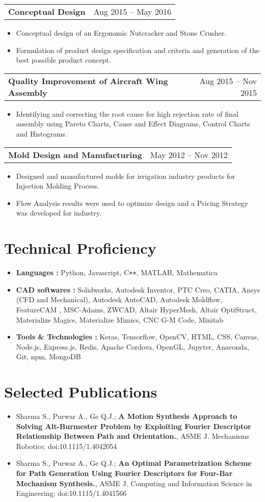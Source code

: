 \documentclass[letterpaper,10pt]{article}
\makeatletter
\newcommand{\resumeHeadingwithDate}[2]{
	\vspace{-1pt}
	\begin{tabular*}{0.97\textwidth}{l@{\extracolsep{\fill}}r}
		\textbf{#1} & #2 \vspace{-2pt}\\
	\end{tabular*}
	\vspace{+2pt}
}
\newcommand{\resumeSection}[1]{
\vspace{-12pt}
\section{\textbf{#1}}
}
\newcommand{\resumeItemListStart}{
\vspace{-7pt}
\begin{itemize}[leftmargin=14pt]
}
\newcommand{\resumeItemListEnd}{
\vspace{+7pt}
\end{itemize}
}
\newcommand{\resumeItem}[1]{
  \item\small{
      {#1 \vspace{-7pt}
      }
  }
}
\makeatother
\begin{document}
    \vspace{-4pt}
    \resumeHeadingwithDate{Conceptual Design}{Aug 2015 -- May 2016}
    \resumeItemListStart
    \resumeItem{Conceptual design of an Ergonomic Nutcracker and Stone Crusher.}
    \resumeItem{Formulation of product design specification and criteria and generation of the best possible product concept.}
    \resumeItemListEnd
    
    \vspace{-4pt}
    \resumeHeadingwithDate{Quality Improvement of Aircraft Wing Assembly}{Aug 2015 -- Nov 2015}
    \resumeItemListStart
    \resumeItem{Identifying and correcting the root cause for high rejection rate of final assembly using Pareto Charts, Cause and Effect Diagrams, Control Charts and Histograms.}
    \resumeItemListEnd
    
    \vspace{-4pt}
    \resumeHeadingwithDate{Mold Design and Manufacturing}{May 2012 -- Nov 2012}
    \resumeItemListStart
    \resumeItem{Designed and manufactured molds for irrigation industry products for Injection Molding Process.}
    \resumeItem{Flow Analysis results were used to optimize design and a Pricing Strategy was developed for industry.}
    \resumeItemListEnd
    
    
    
\resumeSection{Technical Proficiency}
    \vspace{+7pt}
    \resumeItemListStart
    \resumeItem{\textbf{Languages :} Python, Javascript, C\texttt{++}, MATLAB, Mathematica}
    \resumeItem{\textbf{CAD softwares :} Solidworks, Autodesk Inventor, PTC Creo, CATIA, Ansys (CFD and Mechanical), Autodesk AutoCAD, Autodesk Moldflow, FeatureCAM , MSC-Adams, ZWCAD, Altair HyperMesh, Altair OptiStruct, Materialize Magics, Materialize Mimics, CNC G-M Code, Minitab}
    \resumeItem{\textbf{Tools \& Technologies :} Keras, Tensorflow, OpenCV, HTML, CSS, Canvas, Node.js, Express.js, Redis, Apache Cordova, OpenGL, Jupyter, Anaconda, Git, npm, MongoDB}
    \resumeItemListEnd
    
    
    
\resumeSection{Selected Publications}
	\vspace{+7pt}
	\resumeItemListStart
	\resumeItem{Sharma S., Purwar A., Ge Q.J.; \textbf{A Motion Synthesis Approach to Solving Alt-Burmester Problem by Exploiting Fourier Descriptor Relationship Between Path and Orientation.}, ASME J. Mechanisms Robotics; doi:10.1115/1.4042054}
	\resumeItem{Sharma S., Purwar A., Ge Q.J.; \textbf{An Optimal Parametrization Scheme for Path Generation Using Fourier Descriptors for Four-Bar Mechanism Synthesis.}, ASME J. Computing and Information Science in Engineering; doi:10.1115/1.4041566}
	\resumeItemListEnd
\end{document}
